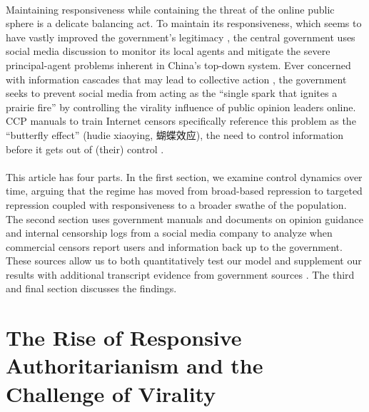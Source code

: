\documentclass[12pt]{article}
\begin{document}
\begin{CJK*}{UTF8}{gbsn}
\paragraph{} Maintaining responsiveness while containing the threat of the online public sphere is a delicate balancing act. To maintain its responsiveness, which seems to have vastly improved the government's legitimacy \citep{nathan2003authoritarian,dickson2016dictator,tang2016populist,zhang2017reza}, the central government uses social media discussion to monitor its local agents and mitigate the severe principal-agent problems inherent in China's top-down system. Ever concerned with information cascades that may lead to collective action \citep{kuran1991now, lohmann1994dynamics, denardo2014power}, the government seeks to prevent social media from acting as the ``single spark that ignites a prairie fire'' by controlling the virality influence of public opinion leaders online. CCP manuals to train Internet censors specifically reference this problem as the ``butterfly effect'' (hudie xiaoying, 蝴蝶效应), the need to control information before it gets out of (their) control \citep{wei2015gongan,gao2011wangluo,zou2015wangluo,guowuyuan2016guowuyuan}.
 
\paragraph{} This article has four parts. In the first section, we examine control dynamics over time, arguing that the regime has moved from broad-based repression to targeted repression coupled with responsiveness to a broader swathe of the population.  The second section uses government manuals and documents on opinion guidance and internal censorship logs from a social media company to analyze when commercial censors report users and information back up to the government. These sources allow us to both quantitatively test our model and supplement our results with additional transcript evidence from government sources \citep{doi:10.1177/0951629816664420}. The third and final section discusses the findings.

\section{The Rise of Responsive Authoritarianism and the Challenge of Virality}


\end{CJK*}
\end{document}
